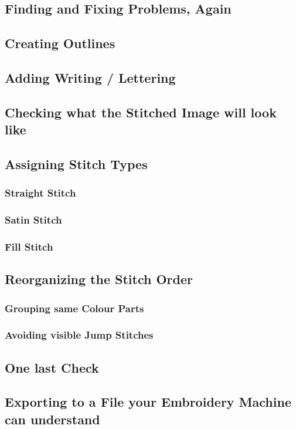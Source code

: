 \documentclass{article}
\begin{document}
        \subsection{Finding and Fixing Problems, Again}

        \subsection{Creating Outlines}
        
        \subsection{Adding Writing / Lettering}

        \subsection{Checking what the Stitched Image will look like}
        
        \subsection{Assigning Stitch Types}
            \subsubsection{Straight Stitch}
            \subsubsection{Satin Stitch}
            \subsubsection{Fill Stitch}
        
        \subsection{Reorganizing the Stitch Order}
            \subsubsection{Grouping same Colour Parts}
            \subsubsection{Avoiding visible Jump Stitches}
        
        \subsection{One last Check}
        
        \subsection{Exporting to a File your Embroidery Machine can understand}
\end{document}
